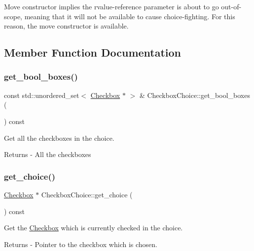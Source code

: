 Move constructor implies the rvalue-\/reference parameter is about to go out-\/of-\/scope, meaning that it will not be available to cause choice-\/fighting. For this reason, the move constructor is available. 

\subsection{Member Function Documentation}
\mbox{\label{class_checkbox_choice_a76ea2985a33d1b48b637d049f55c2443}} 
\subsubsection{\texorpdfstring{get\+\_\+bool\+\_\+boxes()}{get\_bool\_boxes()}}
{\footnotesize\ttfamily const std\+::unordered\+\_\+set$<$ \mbox{\hyperlink{class_checkbox}{Checkbox}} $\ast$ $>$ \& Checkbox\+Choice\+::get\+\_\+bool\+\_\+boxes (\begin{DoxyParamCaption}{ }\end{DoxyParamCaption}) const}

Get all the checkboxes in the choice. \begin{DoxyReturn}{Returns}
-\/ All the checkboxes 
\end{DoxyReturn}
\mbox{\label{class_checkbox_choice_a61b7eedbf1aa28060ac22b47039b060a}} 
\subsubsection{\texorpdfstring{get\+\_\+choice()}{get\_choice()}}
{\footnotesize\ttfamily \mbox{\hyperlink{class_checkbox}{Checkbox}} $\ast$ Checkbox\+Choice\+::get\+\_\+choice (\begin{DoxyParamCaption}{ }\end{DoxyParamCaption}) const}

Get the \mbox{\hyperlink{class_checkbox}{Checkbox}} which is currently checked in the choice. \begin{DoxyReturn}{Returns}
-\/ Pointer to the checkbox which is chosen. 
\end{DoxyReturn}
\mbox{\label{class_checkbox_choice_a6fd60881829607567eac28ba82c6a5b4}} 
